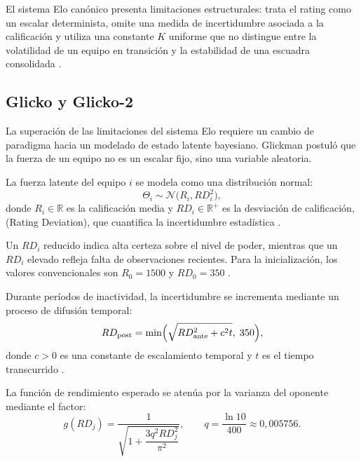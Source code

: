 El sistema Elo can\'onico presenta limitaciones estructurales: trata el rating como un escalar determinista, omite una medida de incertidumbre asociada a la calificaci\'on y utiliza una constante $K$ uniforme que no distingue entre la volatilidad de un equipo en transici\'on y la estabilidad de una escuadra consolidada \cite{Glickman1995}.

\subsection{Glicko y Glicko-2}

La superaci\'on de las limitaciones del sistema Elo requiere un cambio de paradigma hacia un modelado de estado latente bayesiano. Glickman \cite{Glickman1995} postul\'o que la fuerza de un equipo no es un escalar fijo, sino una variable aleatoria.

\begin{definition}
	La fuerza latente del equipo $i$ se modela como una distribuci\'on normal:
	\begin{equation}
		\Theta_i \sim \mathcal{N}\bigl(R_i, RD_i^2\bigr),
	\end{equation}
	donde $R_i \in \mathbb{R}$ es la calificaci\'on media y $RD_i \in \mathbb{R}^+$ es la desviaci\'on de calificaci\'on, (Rating Deviation), que cuantifica la incertidumbre estad\'istica \cite{Glickman1995}.
\end{definition}

Un $RD_i$ reducido indica alta certeza sobre el nivel de poder, mientras que un $RD_i$ elevado refleja falta de observaciones recientes. Para la inicializaci\'on, los valores convencionales son $R_0 = 1500$ y $RD_0 = 350$ \cite{Glickman1995}.

Durante per\'iodos de inactividad, la incertidumbre se incrementa mediante un proceso de difusi\'on temporal:
\begin{equation}
	RD_{\text{post}} = \min\Bigl(\sqrt{RD_{\text{ante}}^2 + c^2 t},\; 350\Bigr),
\end{equation}
donde $c > 0$ es una constante de escalamiento temporal y $t$ es el tiempo transcurrido \cite{Glickman1995}.

La funci\'on de rendimiento esperado se aten\'ua por la varianza del oponente mediante el factor:
\begin{equation}
	g(RD_j) = \frac{1}{\sqrt{1 + \dfrac{3q^2 RD_j^2}{\pi^2}}}, \qquad q = \frac{\ln 10}{400} \approx 0{,}005756.
\end{equation}

